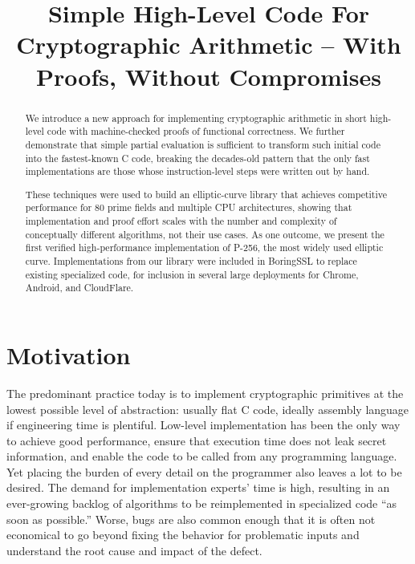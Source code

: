 \documentclass[conference,letterpaper]{IEEEtran}
\begin{document}
\title{Simple High-Level Code For Cryptographic Arithmetic -- With Proofs, Without Compromises}

\author{%
}

\maketitle

\begin{abstract}
  We introduce a new approach for implementing cryptographic arithmetic in short high-level code with machine-checked proofs of functional correctness.
  We further demonstrate that simple partial evaluation is sufficient to transform such initial code into the fastest-known C code,
  breaking the decades-old pattern that the only fast implementations are those whose instruction-level steps were written out by hand.

  These techniques were used to build an elliptic-curve library that achieves competitive performance for 80 prime fields and multiple CPU architectures, showing that implementation and proof effort scales with the number and complexity of conceptually different algorithms, not their use cases.
  As one outcome, we present the first verified high-performance implementation of P-256, the most widely used elliptic curve.
  Implementations from our library were included in BoringSSL to replace existing specialized code, for inclusion in several large deployments for Chrome, Android, and CloudFlare.
\end{abstract}

\IEEEpeerreviewmaketitle

\section{Motivation}

The predominant practice today is to implement cryptographic primitives at the lowest possible level of abstraction: usually flat C code, ideally assembly language if engineering time is plentiful.
Low-level implementation has been the only way to achieve good performance, ensure that execution time does not leak secret information, and enable the code to be called from any programming language.
Yet placing the burden of every detail on the programmer also leaves a lot to be desired.
The demand for implementation experts' time is high, resulting in an ever-growing backlog of algorithms to be reimplemented in specialized code ``as soon as possible.''
Worse, bugs are also common enough that it is often not economical to go beyond fixing the behavior for problematic inputs and understand the root cause and impact of the defect.
\end{document}
